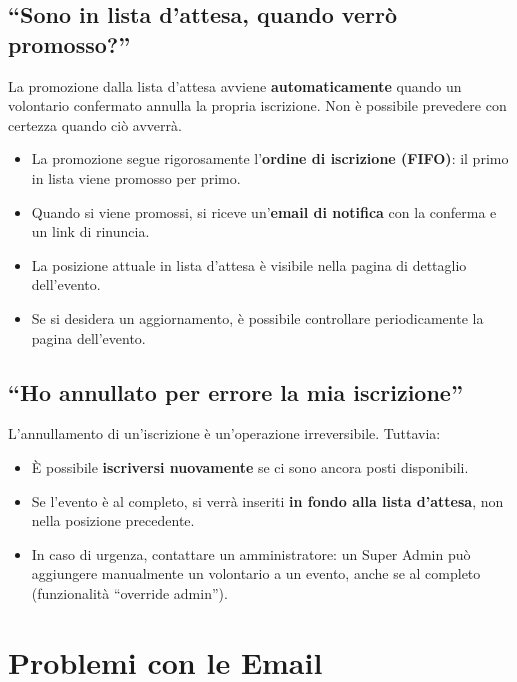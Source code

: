 \documentclass[a4paper,11pt,oneside]{book}
\begin{document}
\subsection{``Sono in lista d'attesa, quando verr\`o promosso?''}

La promozione dalla lista d'attesa avviene \textbf{automaticamente} quando un volontario confermato annulla la propria iscrizione. Non \`e possibile prevedere con certezza quando ci\`o avverr\`a.

\begin{itemize}[leftmargin=1.5em]
  \item La promozione segue rigorosamente l'\textbf{ordine di iscrizione (FIFO)}: il primo in lista viene promosso per primo.
  \item Quando si viene promossi, si riceve un'\textbf{email di notifica} con la conferma e un link di rinuncia.
  \item La posizione attuale in lista d'attesa \`e visibile nella pagina di dettaglio dell'evento.
  \item Se si desidera un aggiornamento, \`e possibile controllare periodicamente la pagina dell'evento.
\end{itemize}

\subsection{``Ho annullato per errore la mia iscrizione''}

L'annullamento di un'iscrizione \`e un'operazione irreversibile. Tuttavia:

\begin{itemize}[leftmargin=1.5em]
  \item \`E possibile \textbf{iscriversi nuovamente} se ci sono ancora posti disponibili.
  \item Se l'evento \`e al completo, si verr\`a inseriti \textbf{in fondo alla lista d'attesa}, non nella posizione precedente.
  \item In caso di urgenza, contattare un amministratore: un Super Admin pu\`o aggiungere manualmente un volontario a un evento, anche se al completo (funzionalit\`a ``override admin'').
\end{itemize}

\section{Problemi con le Email}
\label{sec:problemi-email}
\end{document}
